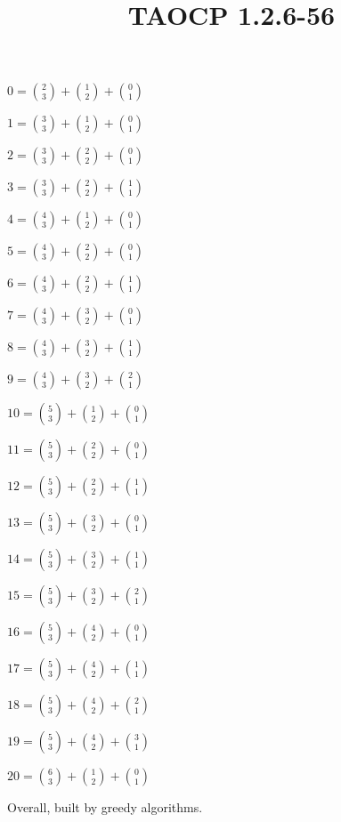 \documentclass{article}
\title{TAOCP 1.2.6\mbox{-}56}
\begin{document}
\maketitle

\( 0 = \binom{2}{3} + \binom{1}{2} + \binom{0}{1} \)

\( 1 = \binom{3}{3} + \binom{1}{2} + \binom{0}{1} \)

\( 2 = \binom{3}{3} + \binom{2}{2} + \binom{0}{1} \)

\( 3 = \binom{3}{3} + \binom{2}{2} + \binom{1}{1} \)

\( 4 = \binom{4}{3} + \binom{1}{2} + \binom{0}{1} \)

\( 5 = \binom{4}{3} + \binom{2}{2} + \binom{0}{1} \)

\( 6 = \binom{4}{3} + \binom{2}{2} + \binom{1}{1} \)

\( 7 = \binom{4}{3} + \binom{3}{2} + \binom{0}{1} \)

\( 8 = \binom{4}{3} + \binom{3}{2} + \binom{1}{1} \)

\( 9 = \binom{4}{3} + \binom{3}{2} + \binom{2}{1} \)

\( 10 = \binom{5}{3} + \binom{1}{2} + \binom{0}{1} \)

\( 11 = \binom{5}{3} + \binom{2}{2} + \binom{0}{1} \)

\( 12 = \binom{5}{3} + \binom{2}{2} + \binom{1}{1} \)

\( 13 = \binom{5}{3} + \binom{3}{2} + \binom{0}{1} \)

\( 14 = \binom{5}{3} + \binom{3}{2} + \binom{1}{1} \)

\( 15 = \binom{5}{3} + \binom{3}{2} + \binom{2}{1} \)

\( 16 = \binom{5}{3} + \binom{4}{2} + \binom{0}{1} \)

\( 17 = \binom{5}{3} + \binom{4}{2} + \binom{1}{1} \)

\( 18 = \binom{5}{3} + \binom{4}{2} + \binom{2}{1} \)

\( 19 = \binom{5}{3} + \binom{4}{2} + \binom{3}{1} \)

\( 20 = \binom{6}{3} + \binom{1}{2} + \binom{0}{1} \)

Overall, built by greedy algorithms.
\end{document}

